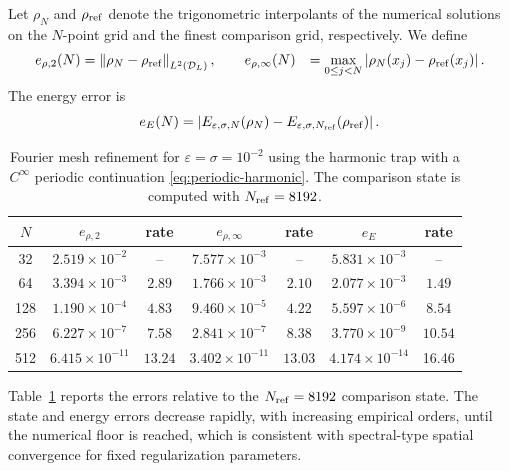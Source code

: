 \documentclass[11pt]{article}
\newcommand{\eps}{\varepsilon}
\newcommand{\sig}{\sigma}
\newcommand{\norm}[1]{\left\|#1\right\|}
\newcommand{\abs}[1]{\left|#1\right|}
\theoremstyle{plain}
\theoremstyle{definition}
\numberwithin{equation}{section}
\begin{document}
Let $\rho_N$ and $\rho_{\rm ref}$ denote the trigonometric
interpolants of the numerical solutions on the $N$-point grid and
the finest comparison grid, respectively. We define
\begin{equation}
\label{eq:spatial-errors}
\begin{aligned}
e_{\rho,2}(N)
&=
\norm{\rho_N-\rho_{\rm ref}}_{L^2(\mathcal D_L)},
\qquad
e_{\rho,\infty}(N)
&=
\max_{0\le j<N}
\left|
\rho_N(x_j)-\rho_{\rm ref}(x_j)
\right|.
\end{aligned}
\end{equation}
The energy error is
\begin{equation}
\label{eq:spatial-energy-error}
e_E(N)
=
\abs{
E_{\eps,\sig,N}(\rho_N)
-
E_{\eps,\sig,N_{\rm ref}}(\rho_{\rm ref})
}.
\end{equation}



\begin{table}[H]
\centering
\small
\caption{
Fourier mesh refinement for $\eps=\sig=10^{-2}$ using the harmonic
trap with a $C^\infty$ periodic continuation \eqref{eq:periodic-harmonic}.
The comparison state is computed with $N_{\rm ref}=8192$.
}
\label{tab:mesh}
\begin{tabular}{ccccccc}
\toprule
$N$
&
$e_{\rho,2}$
&
rate
&
$e_{\rho,\infty}$
&
rate
&
$e_E$
&
rate
\\
\midrule
32
& $2.519\times10^{-2}$
& --
& $7.577\times10^{-3}$
& --
& $5.831\times10^{-3}$
& --
\\
64
& $3.394\times10^{-3}$
& $2.89$
& $1.766\times10^{-3}$
& $2.10$
& $2.077\times10^{-3}$
& $1.49$
\\
128
& $1.190\times10^{-4}$
& $4.83$
& $9.460\times10^{-5}$
& $4.22$
& $5.597\times10^{-6}$
& $8.54$
\\
256
& $6.227\times10^{-7}$
& $7.58$
& $2.841\times10^{-7}$
& $8.38$
& $3.770\times10^{-9}$
& $10.54$
\\
512
& $6.415\times10^{-11}$
& $13.24$
& $3.402\times10^{-11}$
& $13.03$
& $4.174\times10^{-14}$
& 16.46
\\
\bottomrule
\end{tabular}
\end{table}

Table~\ref{tab:mesh} reports the errors relative to the
$N_{\rm ref}=8192$ comparison state. The state and energy errors
decrease rapidly, with increasing empirical orders, until the
numerical floor is reached, which is consistent with spectral-type
spatial convergence for fixed regularization parameters.
\end{document}
